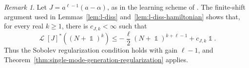 \documentclass[11pt]{article}
\theoremstyle{myplain}
\theoremstyle{mydefinition}
\theoremstyle{remark}
\newtheorem{rmk}[ex]{Remark}
\DeclareMathOperator{\cL}{\mathcal{L}}
\DeclareMathOperator{\1}{\mathds{1}}
\begin{document}
        \begin{rmk}
            
            Let $J=a^{\ell-1}(a-\alpha)$, as in the learning scheme of \cite{Moebus.2025}. The finite-shift argument used in Lemmas~\ref{lem:l-diss} and~\ref{lem:l-diss-hamiltonian} shows that, for every real $k\geq1$, there is $c_{J,k}<\infty$ such that
            \begin{equation*}
                \cL[J]^*((N+\1)^k)
                \leq-\frac\ell2(N+\1)^{k+\ell-1}+c_{J,k}\1.
            \end{equation*}
            Thus the Sobolev regularization condition holds with gain $\ell-1$, and Theorem~\ref{thm:single-mode-generation-regularization} applies.
            
        \end{rmk}
\end{document}
